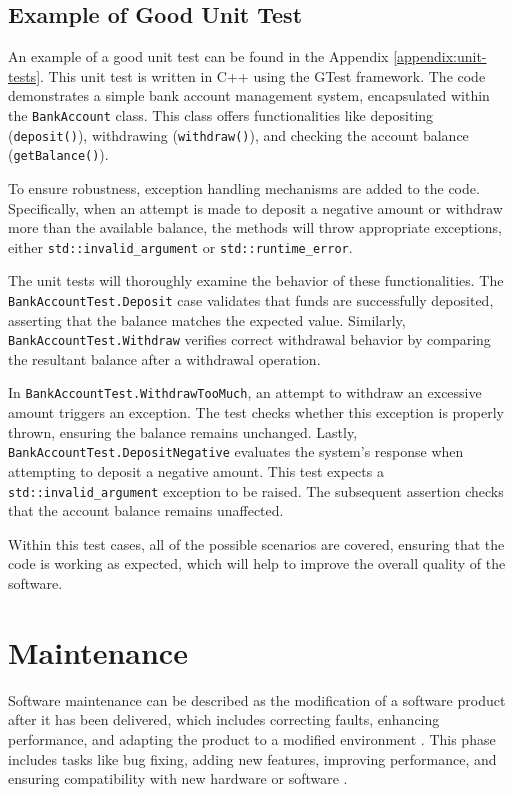 \subsection{Example of Good Unit Test}
\label{subsection:example_of_good_unit_test}

An example of a good unit test can be found in the Appendix \ref{appendix:unit-tests}. This unit test is written in C++ using the GTest framework. The code  demonstrates a simple bank account management system, encapsulated within the \texttt{BankAccount} class. This class offers functionalities like depositing (\texttt{deposit()}), withdrawing (\texttt{withdraw()}), and checking the account balance (\texttt{getBalance()}).

To ensure robustness, exception handling mechanisms are added to the code. Specifically, when an attempt is made to deposit a negative amount or withdraw more than the available balance, the methods will throw appropriate exceptions, either \texttt{std::invalid\_argument} or \texttt{std::runtime\_error}.

The unit tests will thoroughly examine the behavior of these functionalities. The \texttt{BankAccountTest.Deposit} case validates that funds are successfully deposited, asserting that the balance matches the expected value. Similarly, \texttt{{BankAccountTest.Withdraw}} verifies correct withdrawal behavior by comparing the resultant balance after a withdrawal operation.

In \texttt{BankAccountTest.WithdrawTooMuch}, an attempt to withdraw an excessive amount triggers an exception. The test checks whether this exception is properly thrown, ensuring the balance remains unchanged. Lastly, \texttt{BankAccountTest.DepositNegative} evaluates the system's response when attempting to deposit a negative amount. This test expects a \texttt{std::invalid\_argument} exception to be raised. The subsequent assertion checks that the account balance remains unaffected.

Within this test cases, all of the possible scenarios are covered, ensuring that the code is working as expected, which will help to improve the overall quality of the software.

\section{Maintenance}

Software maintenance can be described as the modification of a software product after it has been delivered, which includes correcting faults, enhancing performance, and adapting the product to a modified environment \cite{Bhatt04}. This phase includes tasks like bug fixing, adding new features, improving performance, and ensuring compatibility with new hardware or software \cite{geeksforgeeks_2023b}.

